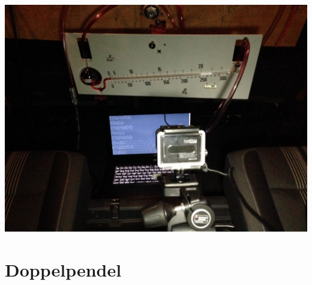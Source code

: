 \documentclass[11pt]{beamer}
\begin{document}
\begin{frame}
	\includegraphics[width=\textwidth]{images/3/IMG_0007}
\end{frame}


\section{Doppelpendel}
\begin{frame}
\end{frame}
\end{document}
